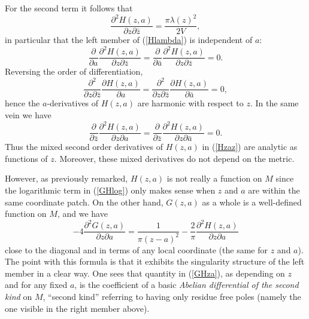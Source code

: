 \documentclass[reqno,12pt]{article}
\theoremstyle{plain}
\theoremstyle{definition}
\numberwithin{equation}{section}
\numberwithin{figure}{section}
\begin{document}
For the second term it follows that
\begin{equation}\label{Hlambda}
\frac{\partial^2 H(z,a)}{\partial z \partial \bar{z}}=\frac{\pi\lambda (z)^2}{2V},
\end{equation} 
in particular that the left member of (\ref{Hlambda}) is independent of $a$: 
\begin{equation}\label{Hazz}
\frac{\partial }{\partial {a}}\frac{\partial^2 H(z,a)}{\partial z\partial \bar{z}}
=\frac{\partial }{\partial \bar{a}}\frac{\partial^2 H(z,a)}{\partial z\partial \bar{z}}=0.
\end{equation}
Reversing the order of differentiation,
\begin{equation}\label{Hzza}
\frac{\partial^2 }{\partial z\partial \bar{z}}\frac{\partial H(z,a)}{\partial a}
=\frac{\partial^2 }{\partial z\partial \bar{z}}\frac{\partial H(z,a)}{\partial \bar{a}}=0,
\end{equation}
hence the $a$-derivatives of $H(z,a)$ are harmonic with respect to $z$. 
In the same vein we have
\begin{equation}\label{Hzaz}
\frac{\partial }{\partial \bar{z}}\frac{\partial^2 H(z,a)}{\partial z\partial a}
=\frac{\partial}{\partial \bar{z}}\frac{\partial^2 H(z,a)}{\partial z\partial \bar{a}}=0.
\end{equation}
Thus the mixed second order derivatives of $H(z,a)$ in (\ref{Hzaz}) are analytic as functions of $z$.
Moreover, these mixed derivatives do not depend on the metric.

However, as previously remarked, $H(z,a)$ is not really a function on $M$ since the logarithmic term in (\ref{GHlog}) 
only makes sense when $z$ and $a$ are within the same coordinate patch.
On the other hand, $G(z,a)$ as a whole is a well-defined function on $M$, and we have
\begin{equation}\label{GHza}
-4\frac{\partial^2 G(z,a)}{\partial z\partial {a}}
=\frac{1}{\pi (z-a)^2}-\frac{2}{\pi}\frac{\partial^2 H(z,a)}{\partial z\partial {a}}
\end{equation}
close to the diagonal and in terms of any local coordinate (the same for $z$ and $a$).  
The point with this formula is that it exhibits the singularity structure of the left member in a clear way.
One sees that  quantity in (\ref{GHza}), as depending on $z$ and for any fixed $a$, 
is the coefficient of a basic {\it Abelian differential of the second kind} on $M$,
``second kind'' referring to having only residue free poles (namely the one visible in the right member above). 
  
\end{document}
